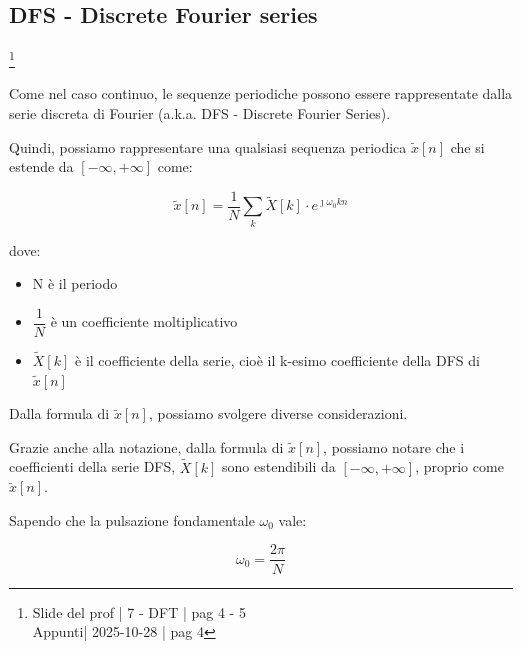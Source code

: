 \newpage 

\subsection{DFS - Discrete Fourier series}

\footnote{ 
    Slide del prof | 7 - DFT | pag 4 - 5\\
    Appunti| 2025-10-28 | pag 4   
}

Come nel caso continuo, le sequenze periodiche possono essere rappresentate dalla serie discreta di Fourier (a.k.a. DFS - Discrete Fourier Series). \newline 

Quindi, possiamo rappresentare una qualsiasi sequenza periodica $\tilde{x} \left[ n\right]$ che si estende da $\left[ - \infty, + \infty\right]$ come: 

{
    \Large 
    \begin{equation}
        \tilde{x} \left[ n\right]
        = 
        \dfrac{1}{N}
        \sum_{k}
        \tilde{X} \left[ k\right] \cdot e^{\jmath \omega_0 k n}
    \end{equation}
}

dove: 

\begin{itemize}
    \item N è il periodo 
    \item $\dfrac{1}{N}$ è un coefficiente moltiplicativo 
    \item $\tilde{X} \left[ k\right]$ è il coefficiente della serie, cioè il k-esimo coefficiente della DFS di $\tilde{x} \left[ n\right]$ \newline
\end{itemize}

Dalla formula di $\tilde{x} \left[ n\right]$, possiamo svolgere diverse considerazioni. \newline 

Grazie anche alla notazione, dalla formula di $\tilde{x} \left[ n\right]$, possiamo notare che i coefficienti della serie DFS, 
$\tilde{X} \left[ k\right]$ sono estendibili da $\left[ - \infty, + \infty\right]$, proprio come $\tilde{x} \left[ n\right]$. \newline 

Sapendo che la pulsazione fondamentale $\omega_0$ vale: 

{
    \Large 
    \begin{equation}
        \omega_0 
        =
        \dfrac{2 \pi}{N}
    \end{equation}
}

